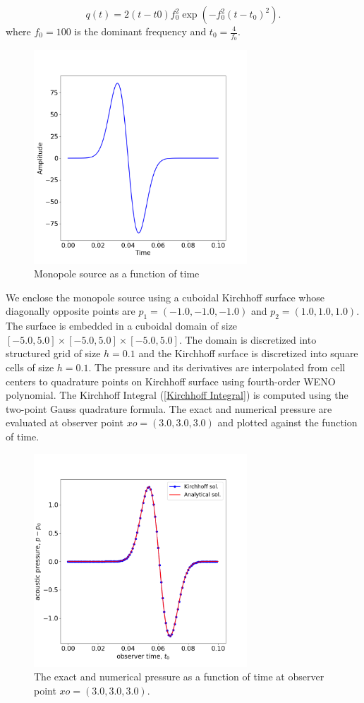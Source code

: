 \documentclass[a4paper]{article}
\begin{document}
\begin{equation}
	q(t) = 2(t - t0)f_{0}^{2}\exp( -f_{0}^2(t - t_{0})^{2}).
\end{equation}
where $f_{0} = 100$ is the dominant frequency and $t_{0} = \frac{4}{f_{0}}$.
\begin{figure}[h!]\label{Monopole}
	\centering
	\includegraphics[width=80mm]{images/Source.png}
	\caption{Monopole source as a function of time}
\end{figure}
We enclose the monopole source using a cuboidal Kirchhoff surface whose diagonally opposite points are $p_{1} = (-1.0, -1.0, -1.0)$
and $p_{2} = (1.0, 1.0, 1.0)$. The surface is embedded in a cuboidal domain of size $[-5.0,5.0]\times[-5.0,5.0]\times[-5.0,5.0]$. The domain is discretized into structured grid of size $h = 0.1$ and the Kirchhoff surface is discretized into square cells of size $h = 0.1$. The pressure and its derivatives are interpolated from cell centers to quadrature points on Kirchhoff surface using fourth-order WENO polynomial. The Kirchhoff Integral (\ref{Kirchhoff Integral}) is computed using the two-point Gauss quadrature formula. The exact and numerical pressure are evaluated at observer point $xo = (3.0,3.0,3.0)$ and plotted against the function of time.
\begin{figure}[h!]\label{Result}
	\centering
	\includegraphics[width=80mm]{images/Pressure.png}
	\caption{The exact and numerical pressure as a function of time at observer point $xo = (3.0,3.0,3.0)$.}
\end{figure}
\end{document}
